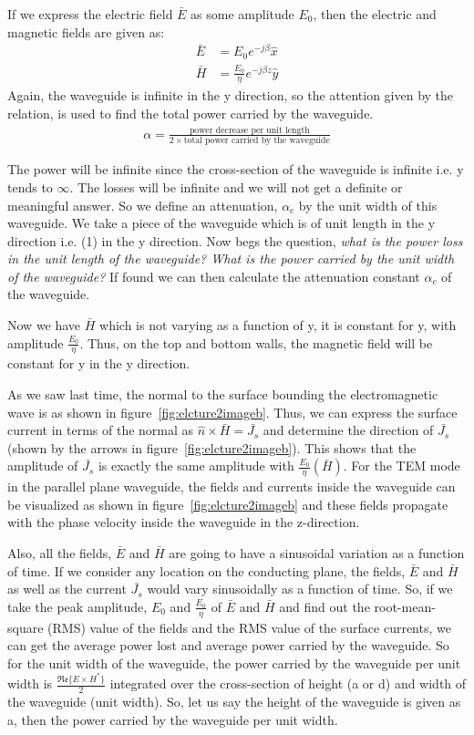 If we express the electric field $\bar{E}$ as some amplitude $E_0$, then the electric and magnetic fields are given as:
\begin{align*}
\bar{E} &= E_0 e^{-j\beta }\hat{x}\\
\bar{H} &= \frac{E_0}{\eta} e^{-j\beta z}\hat{y}
\end{align*}
Again, the waveguide is infinite in the y direction, so the attention given by the relation, is used to find the total power carried by the waveguide.
\begin{align}
\alpha = \frac{\text{power decrease per unit length}}{2 \times \text{total power carried by the waveguide}}
\label{eqn:alphac}
\end{align}

The power will be infinite since the cross-section of the waveguide is infinite i.e. y tends to $\infty$. The losses will be infinite and we will not get a definite or meaningful answer. So we define an attenuation, $\alpha_{c}$ by the unit width of this waveguide. We take a piece of the waveguide which is of unit length in the y direction i.e. (1) in the y direction. Now begs the question, \emph{what is the power loss in the unit length of the waveguide? What is the power carried by the unit width of the waveguide?} If found we can then calculate the attenuation constant $\alpha_{c}$ of the waveguide.

Now we have $\bar{H}$ which is not varying as a function of y, it is constant for y, with amplitude $\frac{E_0}{\eta}$. Thus, on the top and bottom walls, the magnetic field will be constant for y in the y direction.

As we saw last time, the normal to the surface bounding the electromagnetic wave is as shown in figure~\ref{fig:elcture2imageb}. Thus, we can express the surface current in terms of the normal as $\hat{n}\times\bar{H}=\bar{J_s}$ and determine the direction of $\bar{J_s}$ (shown by the arrows in figure~\ref{fig:elcture2imageb}). This shows that the amplitude of $\bar{J_s}$ is exactly the same amplitude with $\frac{E_0}{\eta}(\bar{H})$. For the TEM mode in the parallel plane waveguide, the fields and currents inside the waveguide can be visualized as shown in figure~\ref{fig:elcture2imageb} and these fields propagate with the phase velocity inside the waveguide in the z-direction.

Also, all the fields, $\bar{E}$ and $\bar{H}$ are going to have a sinusoidal variation as a function of time. If we consider any location on the conducting plane, the fields, $\bar{E}$ and $\bar{H}$ as well as the current $\bar{J_s}$ would vary sinusoidally as a function of time. So, if we take the peak amplitude, $E_0$ and $\frac{E_0}{\eta}$ of $\bar{E}$ and $\bar{H}$ and find out the root-mean-square (RMS) value of the fields and the RMS value of the surface currents, we can get the average power lost and average power carried by the waveguide. So for the unit width of the waveguide, the power carried by the waveguide per unit width is $\frac{\mathfrak{Re}\lbrace E \times H^*\rbrace}{2}$ integrated over the cross-section of height (a or d) and width of the waveguide (unit width). So, let us say the height of the waveguide is given as a, then the power carried by the waveguide per unit width.

